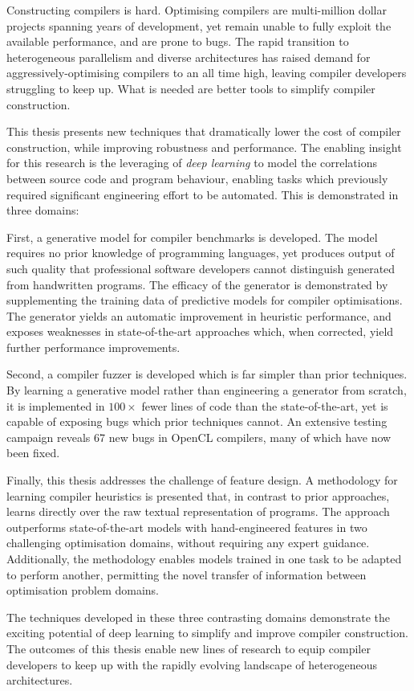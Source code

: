 Constructing compilers is hard. Optimising compilers are multi-million dollar projects spanning years of development, yet remain unable to fully exploit the available performance, and are prone to bugs. The rapid transition to heterogeneous parallelism and diverse architectures has raised demand for aggressively-optimising compilers to an all time high, leaving compiler developers struggling to keep up. What is needed are better tools to simplify compiler construction.

This thesis presents new techniques that dramatically lower the cost of compiler construction, while improving robustness and performance. The enabling insight for this research is the leveraging of \emph{deep learning} to model the correlations between source code and program behaviour, enabling tasks which previously required significant engineering effort to be automated. This is demonstrated in three domains:

First, a generative model for compiler benchmarks is developed. The model requires no prior knowledge of programming languages, yet produces output of such quality that professional software developers cannot distinguish generated from handwritten programs. The efficacy of the generator is demonstrated by supplementing the training data of predictive models for compiler optimisations. The generator yields an automatic improvement in heuristic performance, and exposes weaknesses in state-of-the-art approaches which, when corrected, yield further performance improvements.

Second, a compiler fuzzer is developed which is far simpler than prior techniques. By learning a generative model rather than engineering a generator from scratch, it is implemented in $100\times$ fewer lines of code than the state-of-the-art, yet is capable of exposing bugs which prior techniques cannot. An extensive testing campaign reveals 67 new bugs in OpenCL compilers, many of which have now been fixed.

Finally, this thesis addresses the challenge of feature design. A methodology for learning compiler heuristics is presented that, in contrast to prior approaches, learns directly over the raw textual representation of programs. The approach outperforms state-of-the-art models with hand-engineered features in two challenging optimisation domains, without requiring any expert guidance. Additionally, the methodology enables models trained in one task to be adapted to perform another, permitting the novel transfer of information between optimisation problem domains.

The techniques developed in these three contrasting domains demonstrate the exciting potential of deep learning to simplify and improve compiler construction. The outcomes of this thesis enable new lines of research to equip compiler developers to keep up with the rapidly evolving landscape of heterogeneous architectures.
